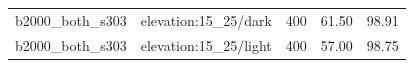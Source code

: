 \begin{longtable}{l>{\raggedright\arraybackslash}p{.42\linewidth}rrr}
b2000\_\allowbreak{}both\_\allowbreak{}s303 & %
elevation:15\_\allowbreak{}25/dark & %
400 & %
61.50 & %
98.91 \\ %

b2000\_\allowbreak{}both\_\allowbreak{}s303 & %
elevation:15\_\allowbreak{}25/light & %
400 & %
57.00 & %
98.75 \\ %


\end{longtable}
